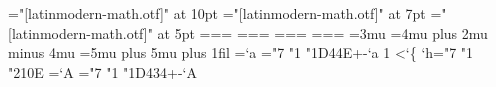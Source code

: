 
\def\space{ }
\def\loop#1\repeat{\def\body{#1}\iterate}\let\repeat=\fi
\def\iterate{\body \let\next\iterate \else\let\next\relax\fi \next}
\font\mt="[latinmodern-math.otf]" at 10pt \font\ms="[latinmodern-math.otf]" at 7pt \font\mss="[latinmodern-math.otf]" at 5pt
=\mt {}=\ms {}=\mss
{}=\mt {}=\ms {}=\mss
{}=\mt {}=\ms {}=\mss
{}=\mt {}=\ms {}=\mss
{} \delimitershortfall=5pt \nulldelimiterspace=1.2pt \scriptspace=0.5pt
\thinmuskip=3mu \medmuskip=4mu plus 2mu minus 4mu \thickmuskip=5mu plus 5mu
\hsize=300pt \parindent=0pt \parfillskip=0pt plus 1fil \baselineskip=12pt
=`a \loop \Umathcode{}="7 "1 \numexpr"1D44E+-`a\relax
  \advance{} 1 \ifnum{}<`\{\repeat
\Umathcode`h="7 "1 "210E
=`A \loop \Umathcode{}="7 "1 \numexpr"1D434+-`A\relax
